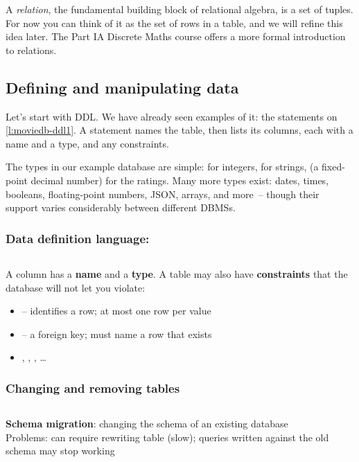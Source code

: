 A \emph{relation}, the fundamental building block of relational algebra, is a set of tuples.
For now you can think of it as the set of rows in a table, and we will refine this idea later.
The Part IA Discrete Maths course offers a more formal introduction to relations.

\subsection{Defining and manipulating data}

Let's start with DDL.
We have already seen examples of it: the  statements on \autoref{l:moviedb-ddl1}.
A  statement names the table, then lists its columns, each with a name and a type, and any constraints.

The types in our example database are simple:  for integers,  for strings,  (a fixed-point decimal number) for the ratings.
Many more types exist: dates, times, booleans, floating-point numbers, JSON, arrays, and more~-- though their support varies considerably between different DBMSs.

\begin{frame}
    \label{s:ddl}
    \frametitle{Data definition language: }
    \inputminted[fontsize=\footnotesize]{sql}{code/ddl-create.sql}
    \vspace{0.5em}\pause
    A column has a \textbf{name} and a \textbf{type}. A table may also have
    \textbf{constraints} that the database will not let you violate:
    \begin{itemize}
        \item {} -- identifies a row; at most one row per value
        \item {} -- a foreign key; must name a row that exists
        \item {}, , , \dots
    \end{itemize}
\end{frame}
\label{l:ddl}

\begin{frame}
    \label{s:ddl-alter}
    \frametitle{Changing and removing tables}
    \inputminted[fontsize=\footnotesize]{sql}{code/ddl-alter.sql}
    \vspace{1em}\pause
    \textbf{Schema migration}: changing the schema of an existing database\\[1em]
    Problems: can require rewriting table (slow); queries written against the old schema may stop working
\end{frame}
\label{l:ddl-alter}

